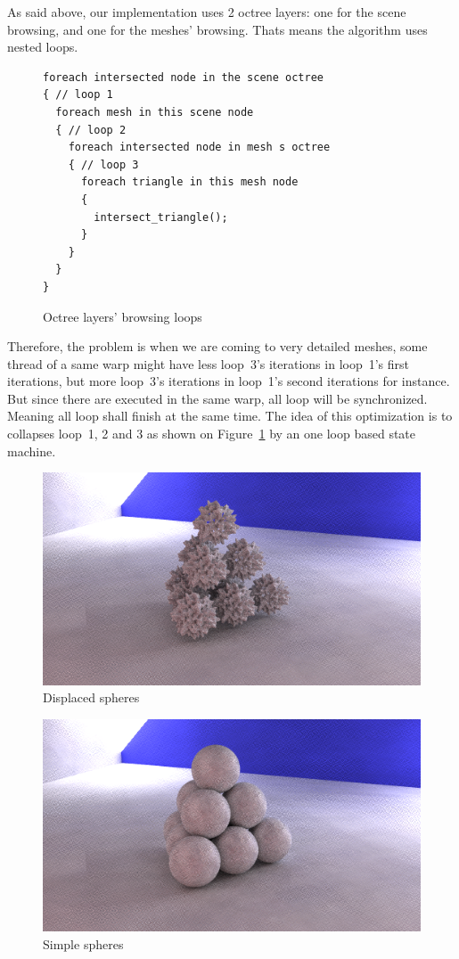 As said above, our implementation uses 2 octree layers: one for the scene browsing,
and one for the meshes' browsing. Thats means the algorithm uses nested loops.
\begin{figure}[H]
    \centering
    \begin{lstlisting}[morekeywords={foreach}]
foreach intersected node in the scene octree
{ // loop 1
  foreach mesh in this scene node
  { // loop 2
    foreach intersected node in mesh s octree
    { // loop 3
      foreach triangle in this mesh node
      {
        intersect_triangle();
      }
    }
  }
}
    \end{lstlisting}
    \caption{Octree layers' browsing loops}
    \label{code:octree_layers_loops}
\end{figure}

Therefore, the problem is when we are coming to very detailed meshes, some thread
of a same warp might have less loop~3's iterations in loop~1's first iterations,
but more loop~3's iterations in loop~1's second iterations for instance. But since
there are executed in the same warp, all loop will be synchronized. Meaning all
loop shall finish at the same time. The idea of this optimization
is to collapses loop~1, 2 and 3 as shown on Figure~\ref{code:octree_layers_loops}
by an one loop based state machine.

\begin{figure}[h]
    \centering
    \includegraphics[width=0.8\columnwidth]{render_displaced_spheres.png}
    \caption{Displaced spheres}
    \label{fig:displaced_spheres}
\end{figure}

\begin{figure}[h]
    \centering
    \includegraphics[width=0.8\columnwidth]{render_spheres.png}
    \caption{Simple spheres}
    \label{fig:spheres}
\end{figure}

